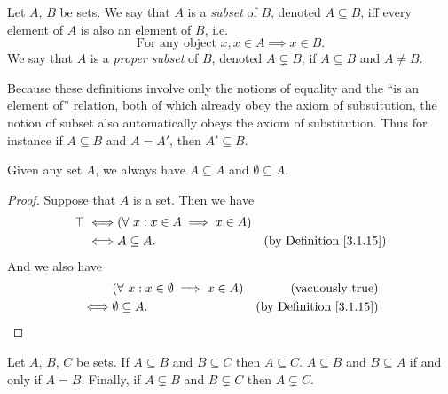 \begin{definition}[Subsets]\label{3.1.15}
    Let \(A\), \(B\) be sets.
    We say that \(A\) is a \emph{subset} of \(B\), denoted \(A \subseteq B\), iff every element of \(A\) is also an element of \(B\), i.e.
    \[
        \text{For any object } x, x \in A \implies x \in B.
    \]
    We say that \(A\) is a \emph{proper subset} of \(B\), denoted \(A \subsetneq B\), if \(A \subseteq B\) and \(A \neq B\).
\end{definition}

\begin{remark}\label{3.1.16}
    Because these definitions involve only the notions of equality and the ``is an element of'' relation, both of which already obey the axiom of substitution, the notion of subset also automatically obeys the axiom of substitution.
    Thus for instance if \(A \subseteq B\) and \(A = A'\), then \(A' \subseteq B\).
\end{remark}

\begin{example}\label{3.1.17}
    Given any set \(A\), we always have \(A \subseteq A\) and \(\emptyset \subseteq A\).
\end{example}

\begin{proof}
    Suppose that \(A\) is a set.
    Then we have
    \begin{align*}
        \top \iff & (\forall\ x : x \in A \implies x \in A)                                       \\
        \iff      & A \subseteq A.                          & \text{(by Definition \ref{3.1.15})}
    \end{align*}
    And we also have
    \begin{align*}
             & (\forall\ x : x \in \emptyset \implies x \in A) & \text{(vacuously true)}             \\
        \iff & \emptyset \subseteq A.                          & \text{(by Definition \ref{3.1.15})}
    \end{align*}
\end{proof}

\begin{proposition}\label{3.1.18}
    Let \(A\), \(B\), \(C\) be sets.
    If \(A \subseteq B\) and \(B \subseteq C\) then \(A \subseteq C\).
    \(A \subseteq B\) and \(B \subseteq A\) if and only if \(A = B\).
    Finally, if \(A \subsetneq B\) and \(B \subsetneq C\) then \(A \subsetneq C\).
\end{proposition}

